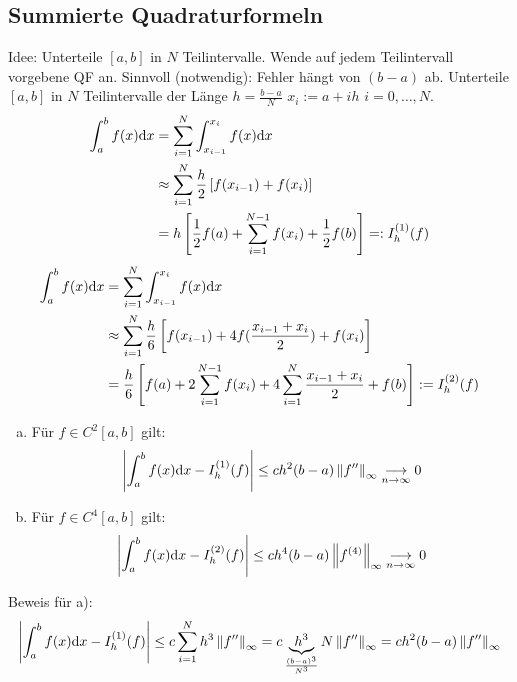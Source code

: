 \subsection{Summierte Quadraturformeln}
Idee: Unterteile $[a,b]$ in $N$ Teilintervalle. Wende auf jedem Teilintervall vorgebene QF an.
Sinnvoll (notwendig): Fehler hängt von $(b-a)$ ab.
Unterteile $[a,b]$ in $N$ Teilintervalle der Länge $h=\frac{b-a}{N}$ $x_i := a + ih$ $i=0,\ldots,N$.
\begin{align*}
  \int_a^b f(x) \mathrm{d}x &= \sum^{N}_{i=1} \int_{x_{i-1}}^{x_i} f(x) \mathrm{d}x\\
  &\approx \sum^{N}_{i=1} \frac{h}{2} \left[f(x_{i-1}) + f(x_i)\right] \\
  &= h\left[\frac{1}{2} f(a) + \sum^{N-1}_{i=1} f(x_i) + \frac{1}{2} f(b)\right] =: I_h^{(1)}(f)
\end{align*}
\begin{align*}
  \int_a^b f(x) \mathrm{d}x &= \sum^{N}_{i=1} \int_{x_{i-1}}^{x_i} f(x) \mathrm{d}x\\
  &\approx \sum^{N}_{i=1} \frac{h}{6} \left[f(x_{i-1}) + 4f(\frac{x_{i-1}+x_i}{2}) + f(x_i)\right] \\
  &= \frac{h}{6} \left[ f(a) + 2 \sum^{N-1}_{i=1} f(x_i) + 4 \sum^{N}_{i=1} \frac{x_{i-1}+x_i}{2} + f(b) \right] := I_h^{(2)}(f)
\end{align*}
\begin{enumerate}[a)]
  \item Für $f \in C^2[a, b]$ gilt: \begin{align*}
    \left| \int_a^b f(x) \mathrm{d}x - I_h^{(1)}(f) \right| \leq ch^2 (b-a) \left\lVert f'' \right\rVert_\infty \underset{n \to \infty}{\longrightarrow} 0
  \end{align*}
  \item Für $f \in C^4[a, b]$ gilt: \begin{align*}
      \left| \int_a^b f(x) \mathrm{d}x - I_h^{(2)}(f) \right| \leq ch^4 (b-a) \left\lVert f^{(4)} \right\rVert_\infty \underset{n \to \infty}{\longrightarrow} 0
  \end{align*}
\end{enumerate}
Beweis für a):
\begin{align*}
  \left| \int_a^b f(x) \mathrm{d}x - I_h^{(1)}(f) \right| \leq c \sum^{N}_{i=1} h^3 \left\lVert f'' \right\rVert_\infty = c \underbrace{h^3}_{\frac{(b-a)^3}{N^3}} N \left\lVert f'' \right\rVert_\infty = c h^2 (b-a) \left\lVert f'' \right\rVert_\infty
\end{align*}


